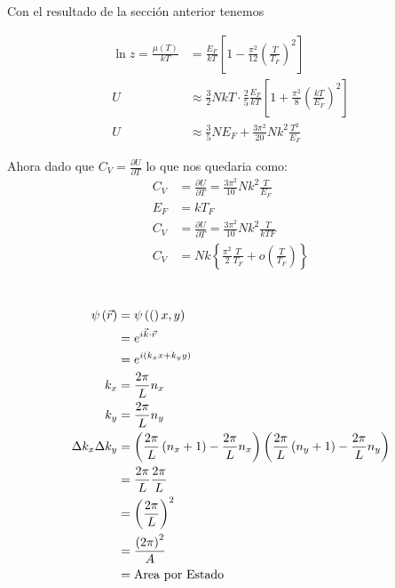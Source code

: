 \documentclass{report}
\begin{document}
Con el resultado de la sección anterior tenemos

\begin{align*}
  \ln z = \frac{\mu(T)}{kT} &= \frac{E_F}{kT} \left[ 1 - \frac{\pi^2}{12} \left( \frac{T}{T_F} \right)^2 \right]\\
  U &\approx \frac{3}{2} NkT \cdot \frac{2}{5} \frac{E_F}{kT} \left[ 1 + \frac{\pi^2}{8} \left( \frac{kT}{E_F} \right)^2 \right]\\
  U &\approx \frac{3}{5} N E_F + \frac{3\pi^2}{20} Nk^2 \frac{T^2}{E_F}
\end{align*}

Ahora dado que $C_V = \frac{\partial U}{\partial T}$ lo que nos quedaria como:
\begin{align*}
  C_V &= \frac{\partial U}{\partial T} = \frac{3\pi^2}{10} Nk^2 \frac{T}{E_F}\\
  E_F &= kT_F\\
  C_V &= \frac{\partial U}{\partial T} = \frac{3\pi^2}{10} Nk^2 \frac{T}{kTF}\\
  C_V &= Nk \left\{\frac{\pi^2}{2} \frac{T}{T_F} + o\left( \frac{T}{T_F} \right)\right\}
\end{align*}

\section{}



\chapter{}

\section{}

\begin{align*}
  \psi\left(\vec{r}\right) &= \psi\left((\right)x, y)\\
  &= e^{i\vec{k}\cdot \vec{r}}\\
  &= e^{i\left(k_x x + k_y y\right)}\\
  k_x &= \frac{2\pi}{L}n_x\\
  k_y &= \frac{2\pi}{L}n_y\\
  \Delta k_x \Delta k_y &= \left(\frac{2\pi}{L}\left(n_x + 1\right) - \frac{2\pi}{L}n_x\right)\left(\frac{2\pi}{L}\left(n_y + 1\right) - \frac{2\pi}{L}n_y\right)\\
  &= \frac{2\pi}{L}\frac{2\pi}{L}\\
  &= \left(\frac{2\pi}{L}\right)^2\\
  &= \frac{\left(2\pi\right)^2}{A}\\
  &= \text{Area por Estado}
\end{align*}
\end{document}
